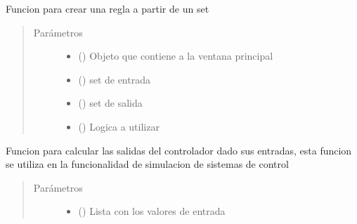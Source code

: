 \documentclass[letterpaper,10pt,spanish]{sphinxmanual}
\begin{document}
\begin{fulllineitems}
\begin{fulllineitems}
\end{fulllineitems}


\begin{fulllineitems}
\label{\detokenize{codigos/rutinas_fuzzy:rutinas_fuzzy.FuzzyController.agregar_regla}}
Funcion para crear una regla a partir de un set
\begin{quote}\begin{description}
\item[{Parámetros}] \leavevmode\begin{itemize}
\item {} 
 () \textendash{} Objeto que contiene a la ventana principal

\item {} 
 () \textendash{} set de entrada

\item {} 
 () \textendash{} set de salida

\item {} 
 () \textendash{} Logica a utilizar

\end{itemize}

\end{description}\end{quote}

\end{fulllineitems}


\begin{fulllineitems}
\label{\detokenize{codigos/rutinas_fuzzy:rutinas_fuzzy.FuzzyController.calcular_valor}}
Funcion para calcular las salidas del controlador dado sus entradas, esta funcion se utiliza en la funcionalidad de simulacion de sistemas de control
\begin{quote}\begin{description}
\item[{Parámetros}] \leavevmode\begin{itemize}
\item {} 
 () \textendash{} Lista con los valores de entrada


\end{itemize}
\end{description}
\end{quote}
\end{fulllineitems}
\end{fulllineitems}
\end{document}
